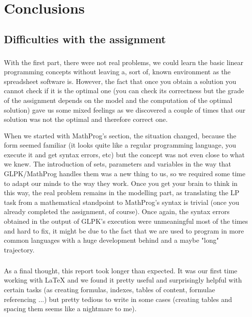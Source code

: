 \chapter{Conclusions}
\label{chapter: conclusions}

\section{Difficulties with the assignment}

\paragraph{}
With the first part, there were not real problems, we could learn the basic linear programming concepts without leaving a, sort of, known environment as the spreadsheet software is. However, the fact that once you obtain a solution you cannot check if it is the optimal one (you can check its correctness but the grade of the assignment depends on the model and the computation of the optimal solution) gave us some mixed feelings as we discovered a couple of times that our solution was not the optimal and therefore correct one.

When we started with MathProg's section, the situation changed, because the form seemed familiar (it looks quite like a regular programming language, you execute it and get syntax errors, etc) but the concept was not even close to what we knew. The introduction of sets, parameters and variables in the way that GLPK/MathProg handles them was a new thing to us, so we required some time to adapt our minds to the way they work. Once you get your brain to think in this way, the real problem remains in the modelling part, as translating the LP task from a mathematical standpoint to MathProg's syntax is trivial (once you already completed the assignment, of course).
Once again, the syntax errors obtained in the output of GLPK's execution were unmeaningful most of the times and hard to fix, it might be due to the fact that we are used to program in more common languages with a huge development behind and a maybe "long" trajectory.

\paragraph{}
As a final thought, this report took longer than expected. It was our first time working with LaTeX and we found it pretty useful and surprisingly helpful with certain tasks (as creating formulas, indexes, tables of content, formulae referencing ...) but pretty tedious to write in some cases (creating tables and spacing them seems like a nightmare to me).

\newpage\null\thispagestyle{empty}\newpage